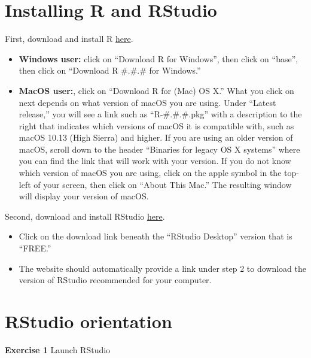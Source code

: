 \documentclass[
]{book}
\providecommand{\tightlist}{%
  \setlength{\itemsep}{0pt}\setlength{\parskip}{0pt}}
\newenvironment{rmdblock}[1]
  {\begin{shaded*}
  }
  {\end{shaded*}
  }
\newenvironment{learncheck}
  {\begin{rmdblock}{warning}}
  {\end{rmdblock}}
\begin{document}
\hypertarget{installing-r-and-rstudio}{%
\section{Installing R and RStudio}\label{installing-r-and-rstudio}}

First, download and install R \href{https://cloud.r-project.org/}{here}.

\begin{itemize}
\tightlist
\item
  \textbf{Windows user:} click on ``Download R for Windows'', then click on ``base'', then click on ``Download R \#.\#.\# for Windows.''
\item
  \textbf{MacOS user:}, click on ``Download R for (Mac) OS X.'' What you click on next depends on what version of macOS you are using. Under ``Latest release,'' you will see a link such as ``R-\#.\#.\#.pkg'' with a description to the right that indicates which versions of macOS it is compatible with, such as macOS 10.13 (High Sierra) and higher. If you are using an older version of macOS, scroll down to the header ``Binaries for legacy OS X systems'' where you can find the link that will work with your version. If you do not know which version of macOS you are using, click on the apple symbol in the top-left of your screen, then click on ``About This Mac.'' The resulting window will display your version of macOS.
\end{itemize}

Second, download and install RStudio \href{https://www.rstudio.com/products/rstudio/download/}{here}.

\begin{itemize}
\tightlist
\item
  Click on the download link beneath the ``RStudio Desktop'' version that is ``FREE.''
\item
  The website should automatically provide a link under step 2 to download the version of RStudio recommended for your computer.
\end{itemize}

\hypertarget{rstudio-orientation}{%
\section{RStudio orientation}\label{rstudio-orientation}}

\begin{learncheck}
\textbf{Exercise 1} Launch RStudio
\end{learncheck}
\end{document}
